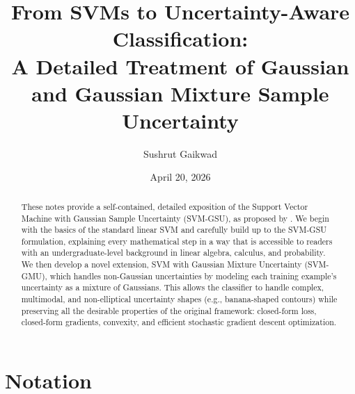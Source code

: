 \documentclass[11pt, letterpaper]{article}
\begin{document}
\title{\textbf{From SVMs to Uncertainty-Aware Classification:\\A Detailed Treatment of Gaussian and Gaussian Mixture Sample Uncertainty}}

\author{Sushrut Gaikwad}
\date{April 20, 2026}
\maketitle

\begin{abstract}
These notes provide a self-contained, detailed exposition of the Support Vector Machine with Gaussian Sample Uncertainty (SVM-GSU), as proposed by \textcite{tzelepis2017linear}. We begin with the basics of the standard linear SVM and carefully build up to the SVM-GSU formulation, explaining every mathematical step in a way that is accessible to readers with an undergraduate-level background in linear algebra, calculus, and probability. We then develop a novel extension, SVM with Gaussian Mixture Uncertainty (SVM-GMU), which handles non-Gaussian uncertainties by modeling each training example's uncertainty as a mixture of Gaussians. This allows the classifier to handle complex, multimodal, and non-elliptical uncertainty shapes (e.g., banana-shaped contours) while preserving all the desirable properties of the original framework: closed-form loss, closed-form gradients, convexity, and efficient stochastic gradient descent optimization.
\end{abstract}

\newpage
\tableofcontents
\newpage

\section*{Notation}
\end{document}
